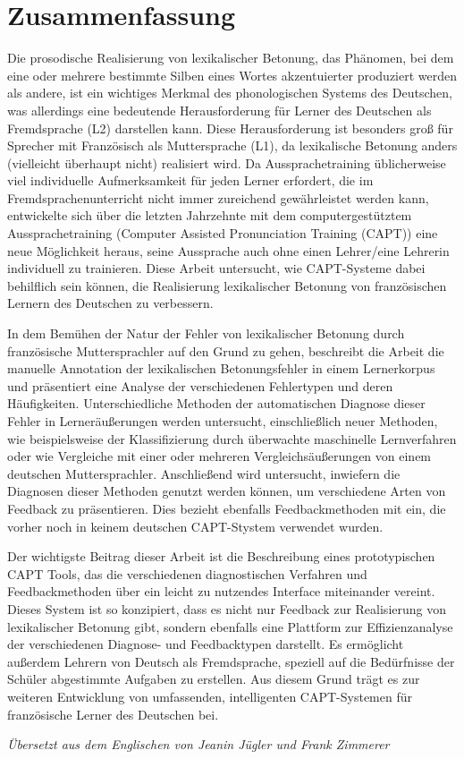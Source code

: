 %
\chapter*{Zusammenfassung}
\label{sec:abstract:de}
\vspace*{-10mm}

Die prosodische Realisierung von lexikalischer Betonung, das Phänomen, bei dem eine oder mehrere bestimmte Silben eines Wortes akzentuierter produziert werden als andere, ist ein wichtiges Merkmal des phonologischen Systems des Deutschen, was allerdings eine bedeutende Herausforderung für Lerner des Deutschen als Fremdsprache (L2) darstellen kann. Diese Herausforderung ist besonders groß für Sprecher mit Französisch als Muttersprache (L1), da lexikalische Betonung anders (vielleicht überhaupt nicht) realisiert wird. Da Aussprachetraining üblicherweise viel individuelle Aufmerksamkeit für jeden Lerner erfordert, die im Fremdsprachenunterricht nicht immer zureichend gewährleistet werden kann, entwickelte sich über die letzten Jahrzehnte mit dem computergestütztem Aussprachetraining (Computer Assisted Pronunciation Training (CAPT)) eine neue Möglichkeit heraus, seine Aussprache auch ohne einen Lehrer/eine Lehrerin individuell zu trainieren. Diese Arbeit untersucht, wie CAPT-Systeme dabei behilflich sein können, die Realisierung lexikalischer Betonung von französischen Lernern des Deutschen zu verbessern. 

In dem Bemühen der Natur der Fehler von lexikalischer Betonung durch französische Muttersprachler auf den Grund zu gehen, beschreibt die Arbeit die manuelle Annotation der lexikalischen Betonungsfehler in einem Lernerkorpus und präsentiert eine Analyse der verschiedenen Fehlertypen und deren Häufigkeiten. Unterschiedliche Methoden der automatischen Diagnose dieser Fehler in Lerneräußerungen werden untersucht, einschließlich neuer Methoden, wie beispielsweise der Klassifizierung durch überwachte maschinelle Lernverfahren oder wie Vergleiche mit einer oder mehreren Vergleichsäußerungen von einem deutschen Muttersprachler. Anschließend wird untersucht, inwiefern die Diagnosen dieser Methoden genutzt werden können, um verschiedene Arten von Feedback zu präsentieren. Dies bezieht ebenfalls Feedbackmethoden mit ein, die vorher noch in keinem deutschen CAPT-Stystem verwendet wurden. 

Der wichtigste Beitrag dieser Arbeit ist die Beschreibung eines prototypischen CAPT Tools,  
das die verschiedenen diagnostischen Verfahren und Feedbackmethoden über ein leicht zu nutzendes Interface miteinander vereint. Dieses System ist so konzipiert, dass es nicht nur Feedback zur Realisierung von lexikalischer Betonung gibt, sondern ebenfalls eine Plattform zur Effizienzanalyse der verschiedenen Diagnose- und Feedbacktypen darstellt. Es ermöglicht außerdem Lehrern von Deutsch als Fremdsprache, speziell auf die Bedürfnisse der Schüler abgestimmte Aufgaben zu erstellen. Aus diesem Grund trägt es zur weiteren Entwicklung von umfassenden, intelligenten CAPT-Systemen für französische Lerner des Deutschen bei. 


\begin{flushright}
\textit{Übersetzt aus dem Englischen von Jeanin Jügler und Frank Zimmerer}
\end{flushright}